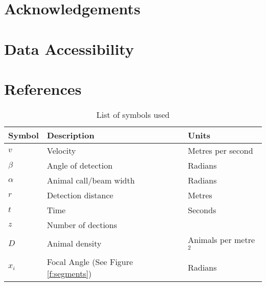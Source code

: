 \documentclass[a4paper,10pt,reqno,oneside]{amsart}
\begin{document}
\section{Acknowledgements}

\section{Data Accessibility}

\section{References}





\begin{table}[t]
\centering
\begin{tabular}{lll}
Symbol 	& Description & Units\\\hline
$v$		& Velocity & Metres per second\\
$\beta$	& Angle of detection & Radians \\
$\alpha$	& Animal call/beam width & Radians \\
$r$ 		& Detection distance & Metres\\
$t$			& Time & Seconds\\
$z$			& Number of dections & \\
$D$		& Animal density & Animals per metre$^2$ \\
$x_i$	& Focal Angle (See Figure \ref{f:segments})		& Radians\\
\end{tabular}
\caption{List of symbols used}
\label{t:paras}
\end{table}



	
	
\end{document}
